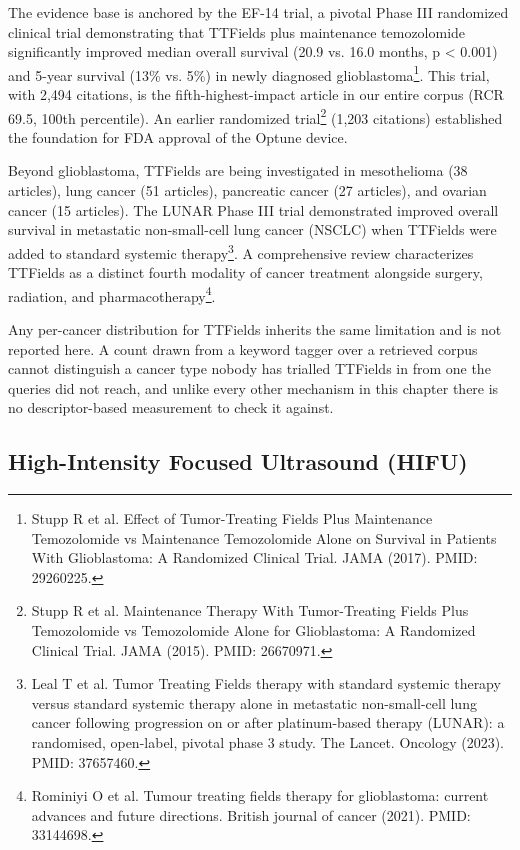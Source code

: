 \documentclass[11pt,twoside,openright]{report}
\begin{document}
The evidence base is anchored by the EF-14 trial, a pivotal Phase III randomized clinical trial demonstrating that TTFields plus maintenance temozolomide significantly improved median overall survival (20.9 vs. 16.0 months, p < 0.001) and 5-year survival (13\% vs. 5\%) in newly diagnosed glioblastoma\footnote{Stupp R et al. Effect of Tumor-Treating Fields Plus Maintenance Temozolomide vs Maintenance Temozolomide Alone on Survival in Patients With Glioblastoma: A Randomized Clinical Trial. JAMA (2017). PMID: 29260225.}. This trial, with 2,494 citations, is the fifth-highest-impact article in our entire corpus (RCR 69.5, 100th percentile). An earlier randomized trial\footnote{Stupp R et al. Maintenance Therapy With Tumor-Treating Fields Plus Temozolomide vs Temozolomide Alone for Glioblastoma: A Randomized Clinical Trial. JAMA (2015). PMID: 26670971.} (1,203 citations) established the foundation for FDA approval of the Optune device.

Beyond glioblastoma, TTFields are being investigated in mesothelioma (38 articles), lung cancer (51 articles), pancreatic cancer (27 articles), and ovarian cancer (15 articles). The LUNAR Phase III trial demonstrated improved overall survival in metastatic non-small-cell lung cancer (NSCLC) when TTFields were added to standard systemic therapy\footnote{Leal T et al. Tumor Treating Fields therapy with standard systemic therapy versus standard systemic therapy alone in metastatic non-small-cell lung cancer following progression on or after platinum-based therapy (LUNAR): a randomised, open-label, pivotal phase 3 study. The Lancet. Oncology (2023). PMID: 37657460.}. A comprehensive review characterizes TTFields as a distinct fourth modality of cancer treatment alongside surgery, radiation, and pharmacotherapy\footnote{Rominiyi O et al. Tumour treating fields therapy for glioblastoma: current advances and future directions. British journal of cancer (2021). PMID: 33144698.}.

Any per-cancer distribution for TTFields inherits the same limitation and is not reported here. A count drawn from a keyword tagger over a retrieved corpus cannot distinguish a cancer type nobody has trialled TTFields in from one the queries did not reach, and unlike every other mechanism in this chapter there is no descriptor-based measurement to check it against.

\subsection{High-Intensity Focused Ultrasound (HIFU)}
\end{document}

